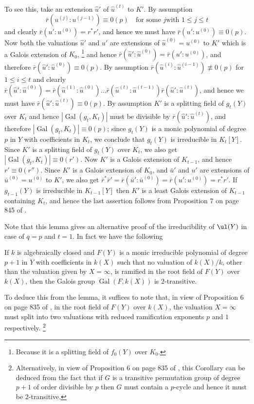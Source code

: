 To see this, take an extension $\hat u'$ of $\hat u^{(t)}$ 
to $K'$.
By assumption 
$$
\bar r(u^{(j)}:u^{(j-1)})\equiv 0(p)\quad \text{for some $j$
with $1\le j\le t$}
$$
and clearly $\bar r(u':u^{(0)})=r^*r'$, and hence 
we must have $\bar r(u':u^{(0)})\equiv 0(p)$. Now both the 
valuations
$\hat u'$ and $u'$ are extensions of $\hat 
u^{(0)}=u^{(0)}$ to $K'$
which is a Galois extension of $K_0$, 
\footnote{Because it is a splitting field of $f_0(Y)$ over 
$K_0$.}
and hence $\bar r(\hat u':\hat u^{(0)})=\bar 
r(u':u^{(0)})$, 
and therefore $\bar r(\hat u':\hat u^{(0)})\equiv 0(p)$. 
By assumption $\bar r(\hat u^{(i)}:\hat 
u^{(i-1)})\not\equiv 0(p)$ 
for $1\le i\le t$ and clearly $\bar r(\hat u':\hat u^{(0)})=
\bar r(\hat u^{(1)}:\hat u^{(0)})\dots \bar r(\hat 
u^{(t)}:\hat u^{(t-1)}) 
\bar r(\hat u':\hat u^{(t)})$, and hence we must have
$\bar r(\hat u':\hat u^{(t)})\equiv 0(p)$. 
By assumption $K'$ is a splitting field of $g_t(Y)$ over 
$K_t$ and hence
$|\operatorname{Gal}(g_t,K_t)|$ must be divisible by $\bar 
r(\hat u':\hat u^{(t)})$,
and therefore $|\operatorname{Gal}(g_t,K_t)|\equiv 0(p)$; 
since $g_t(Y)$ is a monic 
polynomial of degree $p$ in $Y$ with coefficients in 
$K_t$, we conclude that 
$g_t(Y)$ is irreducible in $K_t[Y]$. Since $K'$ is a 
splitting field of 
$g_t(Y)$ over $K_t$, we also get 
$|\operatorname{Gal}(g_t,K_t)|\equiv 0(r')$.
Now $K'$ is a Galois extension of $K_{t-1}$, and hence 
$r'\equiv 0(r'')$.
Since $K'$ is a Galois extension of $K_0$, and $\bar u'$ 
and $u'$ are
extensions of $\bar u^{(0)}=u^{(0)}$ to $K'$, we also get
$\bar r^*\bar r'=\bar r(\bar u':\bar u^{(0)})=\bar 
r(u':u^{(0)})=r^*r'$.
If $g_{t-1}(Y)$ is irreducible in $K_{t-1}[Y]$ then $K'$ 
is a least Galois
extension of $K_{t-1}$ containing $K_t$, and hence the 
last assertion
follows from Proposition 7 on page 845 of \cite{A3}.


Note that this lemma gives an alternative proof of the 
irreducibility of
$\ul(Y)$ in case of $q=p$ and $t=1$. In fact we have the 
following

If $k$ is algebraically closed and $F(Y)$ is a monic 
irreducible polynomial of 
degree $p+1$ in $Y$ with coefficients in $k(X)$ such that 
no valuation of 
$k(X)/k$, other than the valuation given by $X=\infty$, is 
ramified in the
root field of $F(Y)$ over $k(X)$, then the Galois group 
$\operatorname{Gal}(F,k(X))$ is $2$-transitive.
\endproclaim

To deduce this from the lemma, it suffices to note that, 
in view of
Proposition 6 on page 835 of \cite{A3}, in the root field 
of $F(Y)$ over
$k(X)$, the valuation $X=\infty$ must split into two 
valuations with
reduced ramification exponents $p$ and $1$ respectively.
\footnote{
Alternatively, in view of Proposition 6 on page 835 of 
\cite{A3}, 
this Corollary can be deduced from the fact that if $G$ is 
a transitive
permutation group of degree $p+1$ of order divisible by 
$p$ then $G$ must
contain a $p$-cycle and hence it must be $2$-transitive.}

